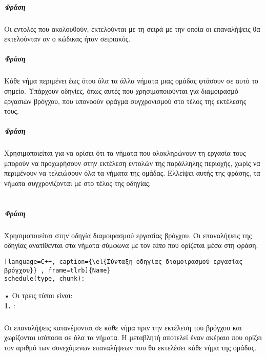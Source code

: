\clearpage
\subparagraph{Φράση \emph{}}
\subparagraph{}
Οι εντολές που ακολουθούν, εκτελούνται με τη σειρά με την οποία οι επαναλήψεις θα εκτελούνταν αν ο κώδικας ήταν σειριακός.

\subparagraph{Φράση \emph{}}
\subparagraph{}
Kάθε νήμα περιμένει έως ότου όλα τα άλλα νήματα μιας ομάδας φτάσουν σε αυτό το σημείο. Υπάρχουν οδηγίες, όπως αυτές που χρησιμοποιούνται για διαμοιρασμό εργασιών βρόγχου, που υπονοούν φράγμα συγχρονισμού \emph{} στο τέλος της εκτέλεσης τους.

\subparagraph{Φράση \emph{}}
\subparagraph{}
Χρησιμοποιείται για να ορίσει ότι τα νήματα που ολοκληρώνουν τη εργασία τους μπορούν να προχωρήσουν στην εκτέλεση εντολών της παράλληλης περιοχής, χωρίς να περιμένουν να τελειώσουν όλα τα νήματα της ομάδας. Ελλείψει αυτής της φράσης, τα νήματα συγχρονίζονται με \emph{} στο τέλος της οδηγίας.
\ \\
\ \\
\subparagraph{Φράση \emph{}}
\subparagraph{}
Χρησιμοποιείται στην οδηγία διαμοιρασμού εργασίας βρόγχου. Οι επαναλήψεις της οδηγίας ανατίθενται στα νήματα σύμφωνα με τον \emph{τύπο} που ορίζεται μέσα στη φράση.
\begin{lstlisting}[language=C++, caption={\el{Σύνταξη οδηγίας διαμοιρασμού εργασίας βρόγχου}} , frame=tlrb]{Name}
schedule(type, chunk): 
\end{lstlisting}
\clearpage
    •  Οι τρεις τύποι \emph{} είναι\cite{jakacorner}:\\
      
\textbf{1. \emph{}}:
\subparagraph{}
Οι επαναλήψεις κατανέμονται σε κάθε νήμα πριν την εκτέλεση του βρόγχου και χωρίζονται ισόποσα σε όλα τα νήματα. Η μεταβλητή \emph{} αποτελεί έναν ακέραιο που ορίζει τον αριθμό των συνεχόμενων επαναλήψεων που θα εκτελέσει κάθε νήμα της ομάδας.

